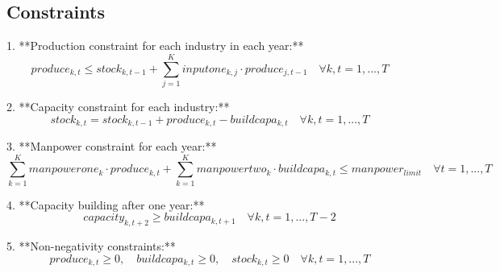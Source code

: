 \documentclass{article}
\begin{document}
\subsection*{Constraints}

1. **Production constraint for each industry in each year:**
\[
produce_{k,t} \leq stock_{k,t-1} + \sum_{j=1}^{K} inputone_{k,j} \cdot produce_{j,t-1} \quad \forall k, t=1,...,T
\]

2. **Capacity constraint for each industry:**
\[
stock_{k,t} = stock_{k,t-1} + produce_{k,t} - buildcapa_{k,t} \quad \forall k, t=1,...,T
\]

3. **Manpower constraint for each year:**
\[
\sum_{k=1}^{K} manpowerone_{k} \cdot produce_{k,t} + \sum_{k=1}^{K} manpowertwo_{k} \cdot buildcapa_{k,t} \leq manpower_{limit} \quad \forall t=1,...,T
\]

4. **Capacity building after one year:**
\[
capacity_{k,t+2} \geq buildcapa_{k,t+1} \quad \forall k, t=1,...,T-2
\]

5. **Non-negativity constraints:**
\[
produce_{k,t} \geq 0, \quad buildcapa_{k,t} \geq 0, \quad stock_{k,t} \geq 0 \quad \forall k, t=1,...,T
\]
\end{document}

